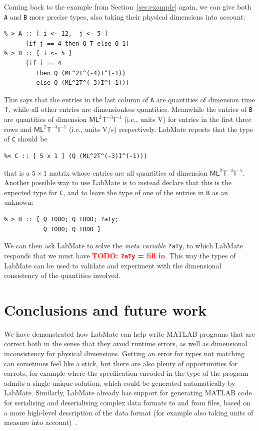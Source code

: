 \documentclass{IMEKO2024}
\newcommand{\remph}{\emph}
\newcommand{\todo}[1]{\textcolor{red}{\textbf{TODO: #1}}}
\begin{document}
Coming back to the example from Section~\ref{sec:example} again, we can give both \texttt{A} and \texttt{B} more precise types, also taking their physical dimensions into account:
\begin{verbatim}
% > A :: [ i <- 12,  j <- 5 ]
      (if j == 4 then Q T else Q 1)
% > B :: [ i <- 5 ]
      (if i == 4
         then Q (ML^2T^(-4)I^(-1))
         else Q (ML^2T^(-3)I^(-1)))
\end{verbatim}
This says that the entries in the last column of \texttt{A} are quantities of dimension time $\mathsf{T}$, while all other entries are dimensionless quantities. Meanwhile the entries of \texttt{B} are quantities of dimension $\mathsf{ML}^{2}\mathsf{T}^{-3}\mathsf{I}^{-1}$ (i.e., units V) for entries in the first three rows and $\mathsf{ML}^{2}\mathsf{T}^{-4}\mathsf{I}^{-1}$ (i.e., units V/s) respectively. LabMate reports that the type of \texttt{C} should be
\begin{verbatim}
%< C :: [ 5 x 1 ] (Q (ML^2T^(-3)I^(-1)))
\end{verbatim}
that is a $5 \times 1$ matrix whose entries are all quantities of dimension $\mathsf{ML}^{2}\mathsf{T}^{-3}\mathsf{I}^{-1}$. Another possible way to use LabMate is to instead declare that this is the expected type for \texttt{C}, and to leave the type of one of the entries in \texttt{B} as an unknown:
\begin{verbatim}
% > B :: [ Q TODO; Q TODO; ?aTy;
           Q TODO; Q TODO ]
\end{verbatim}
We can then ask LabMate to solve the \remph{meta variable} \texttt{?aTy}, to which LabMate responds that we must have \todo{\texttt{?aTy} = fill in}. This way the types of LabMate can be used to validate and experiment with the dimensional consistency of the quantities involved.



\section{Conclusions and future work}

We have demonstrated how LabMate can help write MATLAB programs that are correct both in the sense that they avoid runtime errors, as well as dimensional inconsistency for physical dimensions.
%
Getting an error for types not matching can sometimes feel like a stick, but there are also plenty of opportunities for carrots, for example where the specification encoded in the type of the program admits a single unique solution, which could be generated automatically by LabMate.
%
Similarly, LabMate already has support for generating MATLAB code for serialising and deserialising complex data formats to and from files, based on a more high-level description of the data format (for example also taking units of measure into account)~\cite{mgen}.
\end{document}
